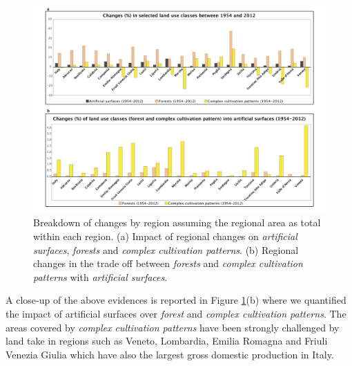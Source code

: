 \documentclass[APA,LATO1COL,doublespace]{WileyNJD-v2}
\newcommand{\toberevised}[1]{\emph{\textcolor{red}{#1}}} %
\begin{document}
\begin{figure}
    \centerline{ \includegraphics[width=450pt]{daMileti/05_caso_nazionale_grafici.pdf} }
    \caption{Breakdown of changes by region assuming the regional area as total within each region.
             (a) Impact of regional changes on \textit{artificial surfaces}, \textit{forests} and \textit{complex cultivation patterns}.
             (b) Regional changes in the trade off between \textit{forests} and \textit{complex cultivation patterns} with \textit{artificial surfaces}.}
    \label{fig:caseIT_graphs}
\end{figure}

A close-up of the above evidences is reported in Figure \ref{fig:caseIT_graphs}(b) where we quantified the impact of artificial surfaces over \textit{forest} and \textit{complex cultivation patterns}. 
The areas covered by \textit{complex cultivation patterns} have been strongly challenged by land take in regions such as Veneto, Lombardia, Emilia Romagna and Friuli Venezia Giulia which have also the largest gross domestic production in Italy.

\end{document}
